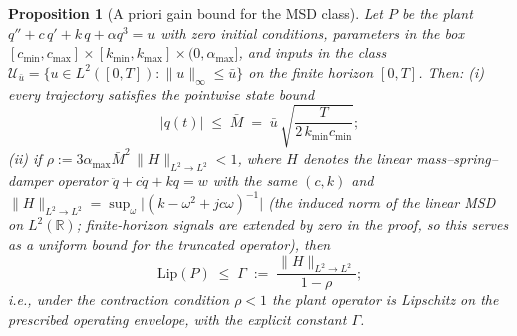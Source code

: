 \documentclass[11pt]{article}
\newtheorem{proposition}{Proposition}
\newcommand{\Ltwo}{L^2}
\begin{document}
\begin{proposition}[A priori gain bound for the MSD class]\label{prop:apriori}
Let $P$ be the plant $q''+c\,q'+k\,q+\alpha q^3=u$ with zero initial
conditions, parameters in the box
$[c_{\min},c_{\max}]\times[k_{\min},k_{\max}]\times(0,\alpha_{\max}]$, and
inputs in the class
$\mathcal{U}_{\bar u}=\{u\in\Ltwo([0,T]):\|u\|_\infty\le\bar u\}$ on the
finite horizon $[0,T]$. Then:
(i) every trajectory satisfies the pointwise state bound
\begin{equation}
  |q(t)| \;\le\; \bar M \;=\; \bar u\,\sqrt{\frac{T}{2\,k_{\min}c_{\min}}};
  \label{eq:Mbar}
\end{equation}
(ii) if
$\rho:=3\alpha_{\max}\bar M^2\,\|H\|_{\Ltwo\to\Ltwo}<1$, where $H$ denotes
the linear mass--spring--damper operator $\ddot q+c\dot q+kq=w$ with the
same $(c,k)$ and
$\|H\|_{\Ltwo\to\Ltwo}=\sup_\omega\big|(k-\omega^2+jc\omega)^{-1}\big|$
(the induced norm of the linear MSD on $L^2(\mathbb{R})$; finite-horizon
signals are extended by zero in the proof, so this serves as a uniform
bound for the truncated operator),
then
\begin{equation}
  \mathrm{Lip}(P)\;\le\;\Gamma \;:=\;
  \frac{\|H\|_{\Ltwo\to\Ltwo}}{1-\rho};
  \label{eq:Gamma}
\end{equation}
i.e., under the contraction condition $\rho<1$ the plant operator is
Lipschitz on the prescribed operating envelope, with the explicit constant
$\Gamma$.
\end{proposition}
\end{document}

